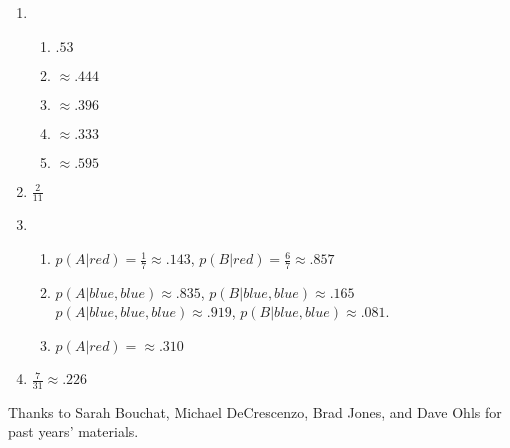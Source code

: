 \documentclass[11pt]{article}
\begin{document}
\begin{enumerate}
\item 
\begin{enumerate}
\item $.53$
\item $\approx .444$
\item $\approx .396$
\item $\approx .333$
\item $\approx .595$
\end{enumerate}


\item $\frac{2}{11}$


\item 
\begin{enumerate}
\item $p(A|red) = \frac{1}{7} \approx .143$, $p(B|red) = \frac{6}{7} \approx .857$
\item $p(A|blue,blue) \approx .835$, $p(B|blue,blue)  \approx .165$ \\   $p(A|blue,blue, blue) \approx .919$, $p(B|blue,blue)  \approx .081$.
\item $p(A|red) = \approx .310$
\end{enumerate}


\item $\frac{7}{31} \approx .226$


\end{enumerate}

\vfill
\begin{center}
\small{Thanks to Sarah Bouchat, Michael DeCrescenzo, Brad Jones, and Dave Ohls for past years' materials.}
\end{center}
\end{document}
